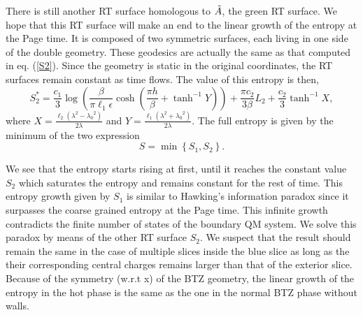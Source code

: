 There is still another RT surface homologous to $\Tilde{A}$, the green RT surface. We hope that this RT surface will make an end to the linear growth of the entropy at the Page time. It is composed of two symmetric surfaces, each living in one side of the double geometry. These geodesics are actually the same as that computed in eq. (\ref{S2}). Since the geometry is static in the original coordinates, the RT surfaces remain constant as time flows. The value of this entropy is then,
\begin{equation}
    S^*_2= \frac{c_1}{3}\log\left(\frac{\beta}{\pi\ell_1\epsilon}\cosh\left(\frac{\pi h}{\beta}+\tanh^{-1}Y\right)\right)+\frac{\pi c_2}{3\beta}L_2+\frac{c_2}{3}\tanh^{-1}X,
\end{equation}
where $X=\frac{\ell_2\left(\lambda^2-{\lambda_0}^2\right)}{2\lambda}$ and $Y=\frac{\ell_1\left(\lambda^2+{\lambda_0}^2\right)}{2\lambda}$. The full entropy is given by the minimum of the two expression
\begin{equation}\label{thats}
    S = \min\left \{S_1,S_2\right \}.
\end{equation}

We see that the entropy starts rising at first, until it reaches the constant value $S_2$ which saturates the entropy and remains constant for the rest of time. This entropy growth given by $S_1$ is similar to Hawking's information paradox since it surpasses the coarse grained entropy at the Page time. This infinite growth contradicts the finite number of states of the boundary QM system. We solve this paradox by means of the other RT surface $S_2$. We suspect that the result should remain the same in the case of multiple slices inside the blue slice as long as the their corresponding central charges remains larger than that of the exterior slice. Because of the symmetry (w.r.t x) of the BTZ geometry, the linear growth of the entropy in the hot phase is the same as the one in the normal BTZ phase without walls.


